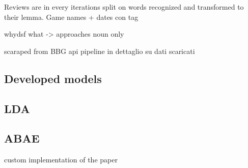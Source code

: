 Reviews are in every iterations split on words recognized and transformed to their lemma.
Game names + dates con tag

whydsf
what
-> approaches
noun only

scaraped from BBG api
pipeline in dettaglio su dati scaricati

\subsection{Developed models}

\subsection{LDA}

\subsection{ABAE}
custom implementation of the paper
